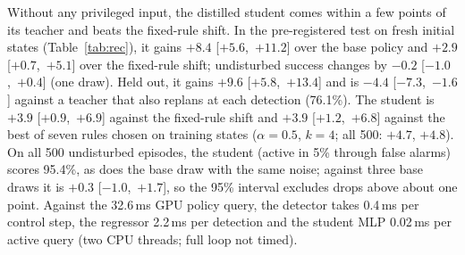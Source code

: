 \documentclass[conference,a4paper]{IEEEtran}
\begin{document}
Without any privileged input, the distilled student comes within a few points of its teacher and beats the fixed-rule shift. In the pre-registered test on fresh initial states (Table~\ref{tab:rec}), it gains $+8.4$ [$+5.6$,~$+11.2$] over the base policy and $+2.9$ [$+0.7$,~$+5.1$] over the fixed-rule shift; undisturbed success changes by $-0.2$ [$-1.0$,~$+0.4$] (one draw). Held out, it gains $+9.6$ [$+5.8$,~$+13.4$] and is $-4.4$ [$-7.3$,~$-1.6$] against a teacher that also replans at each detection (76.1\%). The student is $+3.9$ [$+0.9$,~$+6.9$] against the fixed-rule shift and $+3.9$ [$+1.2$,~$+6.8$] against the best of seven rules chosen on training states ($\alpha=0.5$, $k=4$; all 500: $+4.7$, $+4.8$). On all 500 undisturbed episodes, the student (active in 5\% through false alarms) scores 95.4\%, as does the base draw with the same noise; against three base draws it is $+0.3$ [$-1.0$,~$+1.7$], so the 95\% interval excludes drops above about one point. Against the 32.6\,ms GPU policy query, the detector takes 0.4\,ms per control step, the regressor 2.2\,ms per detection and the student MLP 0.02\,ms per active query (two CPU threads; full loop not timed).
\end{document}
